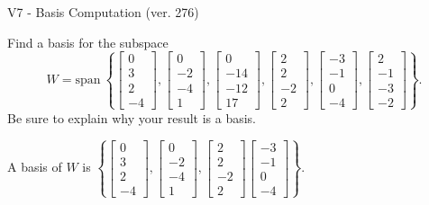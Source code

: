 \begin{exercise}
  \begin{exerciseTitle}V7 - Basis Computation (ver. 276)\end{exerciseTitle}
  \begin{exerciseStatement}
    Find a basis for the subspace 
\[W=\mathrm{span}\ \left\{\left[\begin{array}{r}
0 \\
3 \\
2 \\
-4
\end{array}\right] , \left[\begin{array}{r}
0 \\
-2 \\
-4 \\
1
\end{array}\right] , \left[\begin{array}{r}
0 \\
-14 \\
-12 \\
17
\end{array}\right] , \left[\begin{array}{r}
2 \\
2 \\
-2 \\
2
\end{array}\right] , \left[\begin{array}{r}
-3 \\
-1 \\
0 \\
-4
\end{array}\right] , \left[\begin{array}{r}
2 \\
-1 \\
-3 \\
-2
\end{array}\right]\right\}.\]
 Be sure to explain why your result is a basis.


  \end{exerciseStatement}
  \begin{exerciseAnswer}
   A basis of \(W\) is  \(\left\{\left[\begin{array}{r}
0 \\
3 \\
2 \\
-4
\end{array}\right] , \left[\begin{array}{r}
0 \\
-2 \\
-4 \\
1
\end{array}\right] , \left[\begin{array}{r}
2 \\
2 \\
-2 \\
2
\end{array}\right] \left[\begin{array}{r}
-3 \\
-1 \\
0 \\
-4
\end{array}\right]\right\}\).
  


  \end{exerciseAnswer}
\end{exercise}